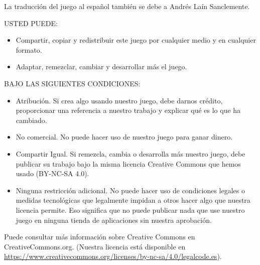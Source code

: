 \documentclass[13pt,a4paper,twocolumn,titlepage]{scrartcl}
\begin{document}
	La traducción del juego al español también se debe a Andrés Laín Sanclemente.
	
	\textcolor{Blue3}{USTED PUEDE:}
	\begin{itemize}
		\item \textcolor{Blue3}{Compartir}, copiar y redistribuir este juego por cualquier medio y en cualquier formato.
		\item \textcolor{Blue3}{Adaptar}, remezclar, cambiar y desarrollar más el juego.
	\end{itemize}
	\textcolor{Blue3}{BAJO LAS SIGUIENTES CONDICIONES:}
	\begin{itemize}
		\item \textcolor{Blue3}{Atribución}. Si crea algo usando nuestro juego, debe darnos crédito, proporcionar una referencia a nuestro trabajo y explicar qué es lo que ha cambiado.
		\item \textcolor{Blue3}{No comercial}. No puede hacer uso de nuestro juego para ganar dinero.
		\item \textcolor{Blue3}{Compartir Igual}. Si remezcla, cambia o desarrolla más nuestro juego, debe publicar su trabajo bajo la misma licencia Creative Commons que hemos usado (BY-NC-SA 4.0).
		\item \textcolor{Blue3}{Ninguna restricción adicional}. No puede hacer uso de condiciones legales o medidas tecnológicas que legalmente impidan a otros hacer algo que nuestra licencia permite. Eso significa que no puede publicar nada que use nuestro juego en ninguna tienda de aplicaciones sin nuestra aprobación.
	\end{itemize}

	Puede consultar más información sobre Creative Commons en CreativeCommons.org. (Nuestra licencia está disponible en  \url{https://www.creativecommons.org/licenses/by-nc-sa/4.0/legalcode.es}).
\end{document}
